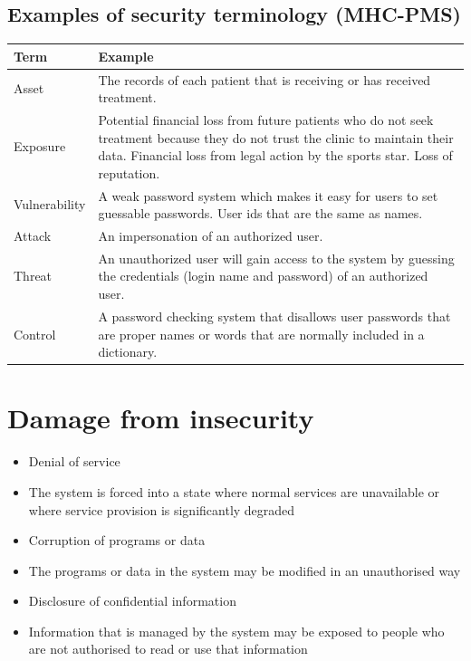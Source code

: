 \subsection{Examples of security terminology (MHC-PMS)}
\begin{table}[h!]
\centering
\begin{tabular}{ |p{3cm}|p{8cm}|  }
\hline
Term & Example \\
\hline
\hline
Asset & The records of each patient that is receiving or has received treatment.\\
\hline
Exposure & Potential financial loss from future patients who do not seek treatment because they do not trust the clinic to maintain their data. Financial loss from legal action by the sports star. Loss of reputation.\\
\hline
Vulnerability & A weak password system which makes it easy for users to set guessable passwords. User ids that are the same as names.\\
\hline
Attack & An impersonation of an authorized user.\\
\hline
Threat & An unauthorized user will gain access to the system by guessing the credentials (login name and password) of an authorized user.\\
\hline
Control & A password checking system that disallows user passwords that are proper names or words that are normally included in a dictionary.\\
\hline
\end{tabular}

\label{table:T4_2}
\end{table}

\section{Damage from insecurity}
\begin{itemize}
\item Denial of service

  \item The system is forced into a state where normal services are unavailable or where service provision is significantly degraded

\item Corruption of programs or data

  \item The programs or data in the system may be modified in an unauthorised way

\item Disclosure of confidential information

  \item Information that is managed by the system may be exposed to people who are not authorised to read or use that information


\end{itemize}
